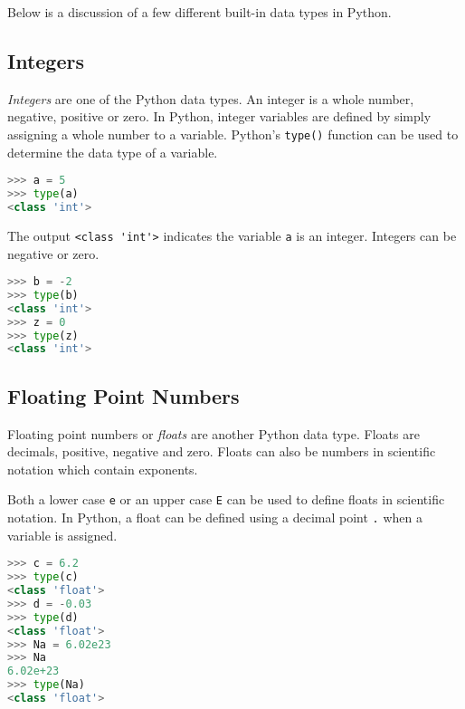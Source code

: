 \documentclass{book}
\newcommand{\passthrough}[1]{#1}
\begin{document}
Below is a discussion of a few different built-in data types in Python.
    




    
        \hypertarget{integers}{%
\subsection{Integers}\label{integers}}

\emph{Integers} are one of the Python data types. An integer is a whole
number, negative, positive or zero. In Python, integer variables are
defined by simply assigning a whole number to a variable. Python's
\passthrough{\lstinline!type()!} function can be used to determine the
data type of a variable.

\begin{lstlisting}[language=Python]
>>> a = 5
>>> type(a)
<class 'int'>
\end{lstlisting}

The output \passthrough{\lstinline!<class 'int'>!} indicates the
variable \passthrough{\lstinline!a!} is an integer. Integers can be
negative or zero.

\begin{lstlisting}[language=Python]
>>> b = -2
>>> type(b)
<class 'int'>
>>> z = 0
>>> type(z)
<class 'int'>
\end{lstlisting}
    




    
        \hypertarget{floating-point-numbers}{%
\subsection{Floating Point Numbers}\label{floating-point-numbers}}

Floating point numbers or \emph{floats} are another Python data type.
Floats are decimals, positive, negative and zero. Floats can also be
numbers in scientific notation which contain exponents.

Both a lower case \passthrough{\lstinline!e!} or an upper case
\passthrough{\lstinline!E!} can be used to define floats in scientific
notation. In Python, a float can be defined using a decimal point
\passthrough{\lstinline!.!} when a variable is assigned.

\begin{lstlisting}[language=Python]
>>> c = 6.2
>>> type(c)
<class 'float'>
>>> d = -0.03
>>> type(d)
<class 'float'>
>>> Na = 6.02e23
>>> Na
6.02e+23
>>> type(Na)
<class 'float'>
\end{lstlisting}
\end{document}
